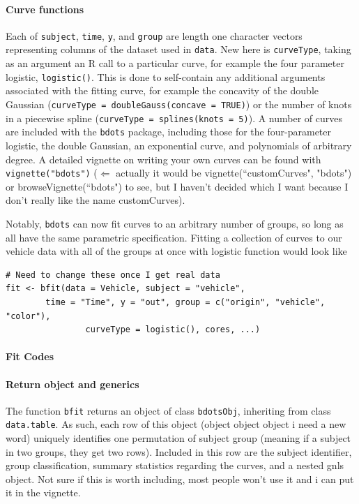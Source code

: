 \documentclass{article}
\begin{document}
\paragraph{Curve functions} Each of \texttt{subject}, \texttt{time}, \texttt{y}, and \texttt{group} are length one character vectors representing columns of the dataset used in \texttt{data}. New here is \texttt{curveType}, taking as an argument an R call to a particular curve, for example the four parameter logistic, \texttt{logistic()}. This is done to self-contain any additional arguments associated with the fitting curve, for example the concavity of the double Gaussian (\texttt{curveType = doubleGauss(concave = TRUE)}) or the number of knots in a piecewise spline (\texttt{curveType = splines(knots = 5)}). A number of curves are included with the \texttt{bdots} package, including those for the four-parameter logistic, the double Gaussian, an exponential curve, and polynomials of arbitrary degree. A detailed vignette on writing your own curves can be found with \texttt{vignette("bdots")} ($\Leftarrow$ actually it would be vignette(``customCurves", "bdots") or browseVignette(``bdots") to see, but I haven't decided which I want because I don't really like the name customCurves).

Notably, \texttt{bdots} can now fit curves to an arbitrary number of groups, so long as all have the same parametric specification. Fitting a collection of curves to our vehicle data with all of the groups at once with logistic function would look like


\begin{center}
\begin{verbatim}
# Need to change these once I get real data
fit <- bfit(data = Vehicle, subject = "vehicle", 
	 	time = "Time", y = "out", group = c("origin", "vehicle", "color"),
	 			curveType = logistic(), cores, ...)
\end{verbatim}
\end{center}

\paragraph{Fit Codes}

\paragraph{Return object and generics}



The function \texttt{bfit} returns an object of class \texttt{bdotsObj}, inheriting from class \texttt{data.table}. As such, each row of this object (object object object i need a new word) uniquely identifies one permutation of subject group (meaning if a subject in two groups, they get two rows). Included in this row are the subject identifier, group classification, summary statistics regarding the curves, and a nested gnls object. Not sure if this is worth including, most people won't use it and i can put it in the vignette.
\end{document}

